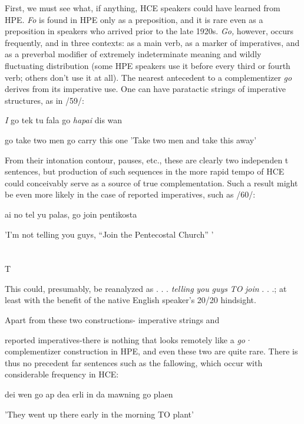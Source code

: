 First, we must see what, if anything, HCE speakers could have learned from HPE. \textit{Fo} is found in HPE only as a preposition, and it is rare even as a preposition in speakers who arrived prior to the late 1920s. \textit{Go,} however, occurs frequently, and in three contexts: as a main verb, as a marker of imperatives, and as a preverbal modifier of extremely indeterminate meaning and wildly fluctuating distribution (some HPE speakers use it before every third or fourth verb; others don't use it at all). The nearest antecedent to a complementizer \textit{go} derives from its imperative use. One can have paratactic strings of imperative structures, as in /59/:

\ea\label{ex:59}
\textit{I} go tek tu fala go \textit{hapai} dis wan

go take two men go carry this one 'Take two men and take this away'
\glt
\z

From their intonation contour, pauses, etc., these are clearly two independen t sentences, but production of such sequences in the more rapid tempo of HCE could conceivably serve as a source of true comple\-mentation. Such a result might be even more likely in the case of reported imperatives, such as /60/:

\ea\label{ex:60}
 ai no tel yu palas, go join pentikosta
\glt
\z

'I'm not telling you guys, ``Join the Pentecostal Church'' '

\section{}
T


This could, presumably, be reanalyzed as . . . \textit{telling} \textit{you} \textit{guys} \textit{TO} \textit{join} . . .; at least with the benefit of the native English speaker's 20/20 hindsight.

Apart from these two constructions- imperative strings and

reported imperatives-there is nothing that looks remotely like a \textit{go·} complementizer construction in HPE, and even these two are quite rare. There is thus no precedent far sentences such as the fallowing, which occur with considerable frequency in HCE:

\ea\label{ex:61}
 dei wen go ap dea erli in da mawning go plaen
\glt
\z

'They went up there early in the morning TO plant'

